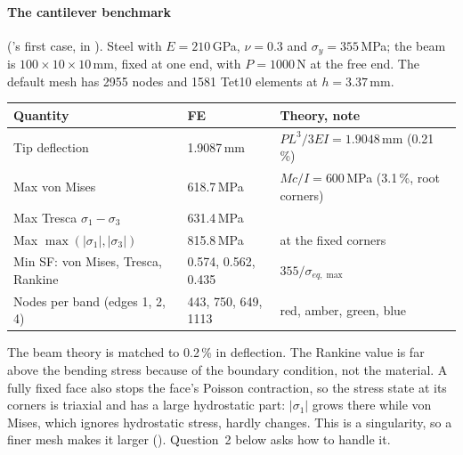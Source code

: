 \paragraph{The cantilever benchmark} ('s first case, in ). Steel with
$E=210$\,GPa, $\nu=0.3$ and $\sigma_y=355$\,MPa; the beam is $100\times10\times10$\,mm, fixed at one end, with
$P=1000$\,N at the free end. The default mesh has 2955 nodes and 1581 Tet10 elements at $h=3.37$\,mm.
\begin{center}
\small
\begin{tabular}{@{}lll@{}}
\toprule
Quantity & FE & Theory, note\\
\midrule
Tip deflection & 1.9087\,mm & $PL^3/3EI=1.9048$\,mm (0.21\,\%)\\
Max von Mises & 618.7\,MPa & $Mc/I=600$\,MPa (3.1\,\%, root corners)\\
Max Tresca $\sigma_1-\sigma_3$ & 631.4\,MPa & \\
Max $\max(|\sigma_1|,|\sigma_3|)$ & 815.8\,MPa & at the fixed corners\\
\midrule
Min SF: von Mises, Tresca, Rankine & 0.574, 0.562, 0.435 & $355/\sigma_{eq,\max}$\\
Nodes per band (edges 1, 2, 4) & 443, 750, 649, 1113 & red, amber, green, blue\\
\bottomrule
\end{tabular}
\end{center}
The beam theory is matched to 0.2\,\% in deflection. The Rankine value is far above the bending stress because
of the boundary condition, not the material. A fully fixed face also stops the face's Poisson contraction, so
the stress state at its corners is triaxial and has a large hydrostatic part: $|\sigma_1|$ grows there while
von Mises, which ignores hydrostatic stress, hardly changes. This is a singularity, so a finer mesh makes it
larger (). Question~2 below asks how to handle it.

